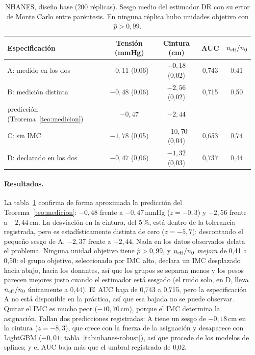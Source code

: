 \begin{table}[ht]
\centering
\caption{NHANES, diseño base (200 réplicas). Sesgo medio del estimador DR con su error de Monte Carlo entre paréntesis. En ninguna réplica hubo unidades objetivo con $\hat p>0,99$.}\label{tab:nhanes}
\begin{tabular}{@{}lcccc@{}}
\toprule
Especificación & Tensión (mmHg) & Cintura (cm) & AUC & $n_{\mathrm{eff}}/n_0$ \\
\midrule
A: medido en los dos & $-0,11$ (0,06) & $-0,18$ (0,02) & 0,743 & 0,41 \\
B: medición distinta & $-0,48$ (0,06) & $-2,56$ (0,02) & 0,715 & 0,50 \\
\quad predicción (Teorema~\ref{teo:medicion}) & $-0,47$ & $-2,44$ & & \\
C: sin IMC & $-1,78$ (0,05) & $-10,70$ (0,04) & 0,653 & 0,74 \\
D: declarado en los dos & $-0,47$ (0,06) & $-1,32$ (0,03) & 0,737 & 0,44 \\
\bottomrule
\end{tabular}
\end{table}

\paragraph{Resultados.} La tabla~\ref{tab:nhanes} confirma de forma aproximada la predicción del Teorema~\ref{teo:medicion}: $-0,48$ frente a $-0,47$\,mmHg ($z=-0,3$) y $-2,56$ frente a $-2,44$\,cm. La desviación en la cintura, del 5\,\%, está dentro de la tolerancia registrada, pero es estadísticamente distinta de cero ($z=-5,7$); descontando el pequeño sesgo de A, $-2,37$ frente a $-2,44$. Nada en los datos observados delata el problema. Ninguna unidad objetivo tiene $\hat p>0,99$, y $n_{\mathrm{eff}}/n_0$ \emph{mejora} de 0,41 a 0,50: el grupo objetivo, seleccionado por IMC alto, declara un IMC desplazado hacia abajo, hacia los donantes, así que los grupos se separan menos y los pesos parecen mejores justo cuando el estimador está sesgado (el ruido solo, en D, lleva $n_{\mathrm{eff}}/n_0$ únicamente a 0,44). El AUC baja de 0,743 a 0,715, pero la especificación A no está disponible en la práctica, así que esa bajada no se puede observar. Quitar el IMC es mucho peor ($-10,70$\,cm), porque el IMC determina la asignación. Fallan dos predicciones registradas: A tiene un sesgo de $-0,18$\,cm en la cintura ($z=-8,3$), que crece con la fuerza de la asignación y desaparece con LightGBM ($-0,01$; tabla~\ref{tab:nhanes-robust}), así que procede de los modelos de splines; y el AUC baja más que el umbral registrado de 0,02.

